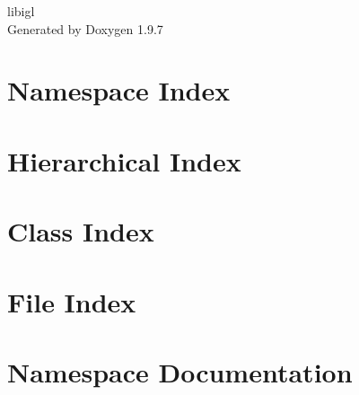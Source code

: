 \documentclass[twoside]{book}
\newcommand{\+}{\discretionary{\mbox{\scriptsize$\hookleftarrow$}}{}{}}
\newcommand{\clearemptydoublepage}{%
    \newpage{\pagestyle{empty}\cleardoublepage}%
  }
\begin{document}
  \raggedbottom
    \hypersetup{pageanchor=false,
                bookmarksnumbered=true,
                pdfencoding=unicode
               }
  \begin{titlepage}
  \vspace*{7cm}
  \begin{center}%
  {\Large libigl}\\
  \vspace*{1cm}
  {\large Generated by Doxygen 1.9.7}\\
  \end{center}
  \end{titlepage}
  \clearemptydoublepage
  \tableofcontents
  \clearemptydoublepage
  \hypersetup{pageanchor=true}


\chapter{Namespace Index}

\chapter{Hierarchical Index}

\chapter{Class Index}

\chapter{File Index}

\chapter{Namespace Documentation}













\end{document}
